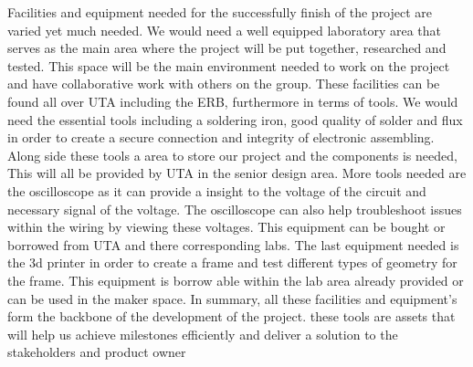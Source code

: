 Facilities and equipment needed for the successfully finish of the project are varied yet much needed. We would need a well equipped laboratory area that serves as the main area where the project will be put together, researched and tested. This space will be the main environment needed to work on the project and have collaborative work with others on the group. These facilities can be found all over UTA including the ERB, furthermore in terms of tools. We would need the essential tools including a soldering iron, good quality of solder and flux in order to create a secure connection and integrity of electronic assembling. Along side these tools a area to store our project and the components is needed, This will all be provided by UTA in the senior design area. More tools needed are the oscilloscope as it can provide a insight to the voltage of the circuit and necessary signal of the voltage. The oscilloscope can also help troubleshoot issues within the wiring by viewing these voltages. This equipment can be bought or borrowed from UTA and there corresponding labs. The last equipment needed is the 3d printer in order to create a frame and test different types of geometry for the frame. This equipment is borrow able within the lab area already provided or can be used in the maker space. In summary, all these facilities and equipment's form the backbone of the development of the project. these tools are assets that will help us achieve milestones efficiently and deliver a solution to the stakeholders and product owner
